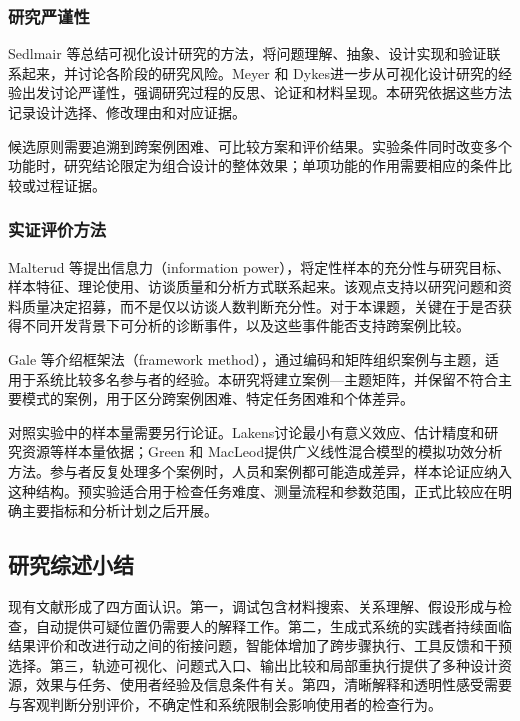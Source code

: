 \subsubsection{研究严谨性}

Sedlmair 等\cite{sedlmair2012design}总结可视化设计研究的方法，将问题理解、抽象、设计实现和验证联系起来，并讨论各阶段的研究风险。Meyer 和 Dykes\cite{meyer2020rigor}进一步从可视化设计研究的经验出发讨论严谨性，强调研究过程的反思、论证和材料呈现。本研究依据这些方法记录设计选择、修改理由和对应证据。

候选原则需要追溯到跨案例困难、可比较方案和评价结果。实验条件同时改变多个功能时，研究结论限定为组合设计的整体效果；单项功能的作用需要相应的条件比较或过程证据。

\subsubsection{实证评价方法}

Malterud 等\cite{malterud2016information}提出信息力（information power），将定性样本的充分性与研究目标、样本特征、理论使用、访谈质量和分析方式联系起来。该观点支持以研究问题和资料质量决定招募，而不是仅以访谈人数判断充分性。对于本课题，关键在于是否获得不同开发背景下可分析的诊断事件，以及这些事件能否支持跨案例比较。

Gale 等\cite{gale2013framework}介绍框架法（framework method），通过编码和矩阵组织案例与主题，适用于系统比较多名参与者的经验。本研究将建立案例—主题矩阵，并保留不符合主要模式的案例，用于区分跨案例困难、特定任务困难和个体差异。

对照实验中的样本量需要另行论证。Lakens\cite{ref67}讨论最小有意义效应、估计精度和研究资源等样本量依据；Green 和 MacLeod\cite{ref68}提供广义线性混合模型的模拟功效分析方法。参与者反复处理多个案例时，人员和案例都可能造成差异，样本论证应纳入这种结构。预实验适合用于检查任务难度、测量流程和参数范围，正式比较应在明确主要指标和分析计划之后开展。

\subsection{研究综述小结}



现有文献形成了四方面认识。第一，调试包含材料搜索、关系理解、假设形成与检查，自动提供可疑位置仍需要人的解释工作。第二，生成式系统的实践者持续面临结果评价和改进行动之间的衔接问题，智能体增加了跨步骤执行、工具反馈和干预选择。第三，轨迹可视化、问题式入口、输出比较和局部重执行提供了多种设计资源，效果与任务、使用者经验及信息条件有关。第四，清晰解释和透明性感受需要与客观判断分别评价，不确定性和系统限制会影响使用者的检查行为。


